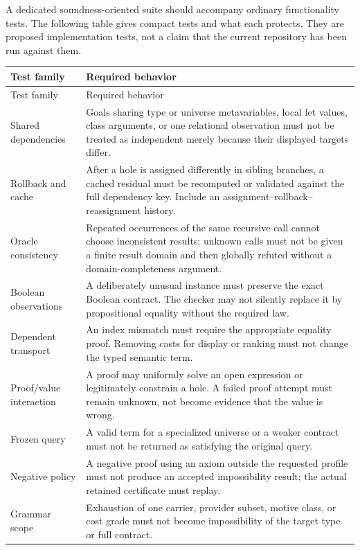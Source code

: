 A dedicated soundness-oriented suite should accompany ordinary functionality tests. The following table gives compact tests and what each protects. They are proposed implementation tests, not a claim that the current repository has been run against them.

\begin{longtable}{@{}L{38mm}L{114mm}@{}}
\toprule
Test family & Required behavior\\
\midrule
\endfirsthead
\toprule
Test family & Required behavior\\
\midrule
\endhead
Shared dependencies & Goals sharing type or universe metavariables, local let values, class arguments, or one relational observation must not be treated as independent merely because their displayed targets differ.\\
Rollback and cache & After a hole is assigned differently in sibling branches, a cached residual must be recomputed or validated against the full dependency key. Include an assignment--rollback--reassignment history.\\
Oracle consistency & Repeated occurrences of the same recursive call cannot choose inconsistent results; unknown calls must not be given a finite result domain and then globally refuted without a domain-completeness argument.\\
Boolean observations & A deliberately unusual  instance must preserve the exact Boolean contract. The checker may not silently replace it by propositional equality without the required law.\\
Dependent transport & An index mismatch must require the appropriate equality proof. Removing casts for display or ranking must not change the typed semantic term.\\
Proof/value interaction & A proof may uniformly solve an open expression or legitimately constrain a hole. A failed proof attempt must remain unknown, not become evidence that the value is wrong.\\
Frozen query & A valid term for a specialized universe or a weaker contract must not be returned as satisfying the original query.\\
Negative policy & A negative proof using an axiom outside the requested profile must not produce an accepted impossibility result; the actual retained certificate must replay.\\
Grammar scope & Exhaustion of one carrier, provider subset, motive class, or cost grade must not become impossibility of the target type or full contract.\\

\end{longtable}
